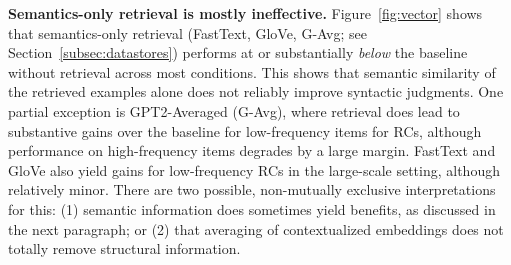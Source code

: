 \noindent \textbf{Semantics-only retrieval is mostly ineffective.} 
Figure~\ref{fig:vector} shows that semantics-only retrieval (FastText, GloVe, G-Avg; see Section~\ref{subsec:datastores}) performs at or substantially \textit{below} the baseline without retrieval across most conditions. This shows that semantic similarity of the retrieved examples alone does not reliably improve syntactic judgments. One partial exception is GPT2-Averaged (G-Avg), where retrieval does lead to substantive gains over the baseline for low-frequency items for RCs, although performance on high-frequency items degrades by a large margin. FastText and GloVe also yield gains for low-frequency RCs in the large-scale setting, although relatively minor. There are two possible, non-mutually exclusive interpretations for this: (1) semantic information does sometimes yield benefits, as discussed in the next paragraph; or (2) that averaging of contextualized embeddings does not totally remove structural information.




